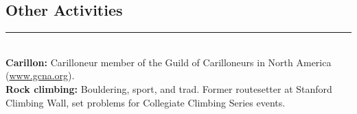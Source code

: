 \documentclass[margin]{res}
\begin{document}
\begin{resume}
\vspace{1pt}\section{Other Activities} \vspace{-15pt} \rule{\textwidth}{0.5pt} \\[3pt]
{\bf Carillon:} Carilloneur member of the Guild of Carilloneurs in North America (\url{www.gcna.org}). \\[3pt]
{\bf Rock climbing:} Bouldering, sport, and trad. Former routesetter at Stanford Climbing Wall, set problems for Collegiate Climbing Series events.

\end{resume}
\end{document}
